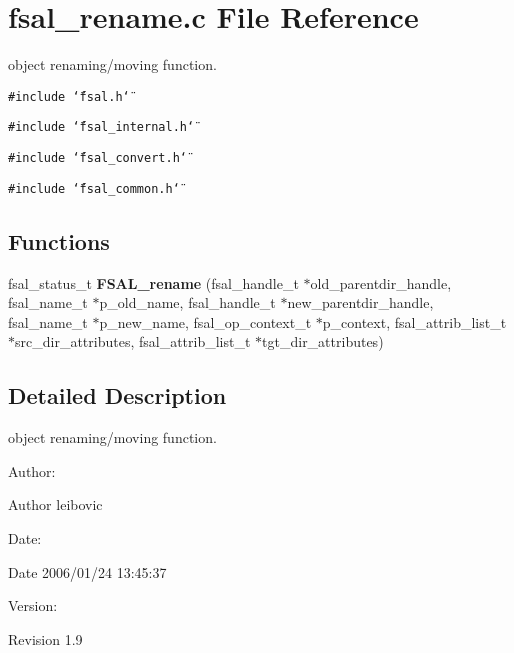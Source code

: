 \section{fsal\_\-rename.c File Reference}
\label{fsal__rename_8c}
object renaming/moving function.  


{\tt \#include \char`\"{}fsal.h\char`\"{}}\par
{\tt \#include \char`\"{}fsal\_\-internal.h\char`\"{}}\par
{\tt \#include \char`\"{}fsal\_\-convert.h\char`\"{}}\par
{\tt \#include \char`\"{}fsal\_\-common.h\char`\"{}}\par
\subsection*{Functions}
\begin{CompactItemize}
\item 
fsal\_\-status\_\-t {\bf FSAL\_\-rename} (fsal\_\-handle\_\-t $\ast$old\_\-parentdir\_\-handle, fsal\_\-name\_\-t $\ast$p\_\-old\_\-name, fsal\_\-handle\_\-t $\ast$new\_\-parentdir\_\-handle, fsal\_\-name\_\-t $\ast$p\_\-new\_\-name, fsal\_\-op\_\-context\_\-t $\ast$p\_\-context, fsal\_\-attrib\_\-list\_\-t $\ast$src\_\-dir\_\-attributes, fsal\_\-attrib\_\-list\_\-t $\ast$tgt\_\-dir\_\-attributes)
\end{CompactItemize}


\subsection{Detailed Description}
object renaming/moving function. 

\begin{Desc}
\item[Author:]\end{Desc}
\begin{Desc}
\item[Author]leibovic \end{Desc}
\begin{Desc}
\item[Date:]\end{Desc}
\begin{Desc}
\item[Date]2006/01/24 13:45:37 \end{Desc}
\begin{Desc}
\item[Version:]\end{Desc}
\begin{Desc}
\item[Revision]1.9 \end{Desc}


